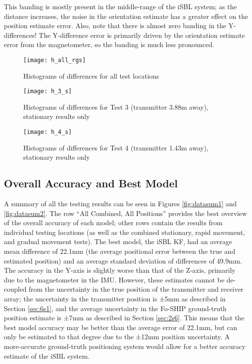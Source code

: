 \documentclass[11pt]{ucthesisCP}
\begin{document}
This banding is mostly present in the middle-range of the iSBL system; as the distance increases, the noise in the orientation estimate has a greater effect on the position estimate error. Also, note that there is almost zero banding in the Y-differences! The Y-difference error is primarily driven by the orientation estimate error from the magnetometer, so the banding is much less pronounced. 

\begin{figure}[htbp]
	\centering
	\texttt{[image: h\_all\_rgs]}
	\caption{Histograms of differences for all test locations}
	\label{fig:h_all_rgs}
\end{figure}

\begin{figure}[htbp]
	\centering
	\texttt{[image: h\_3\_s]}
	\caption{Histograms of differences for Test 3 (transmitter 3.88m away), stationary results only}
	\label{fig:h_3_s}
\end{figure}

\begin{figure}[htbp]
	\centering
	\texttt{[image: h\_4\_s]}
	\caption{Histograms of differences for Test 4 (transmitter 1.43m away), stationary results only}
	\label{fig:h_4_s}
\end{figure}

\subsection{Overall Accuracy and Best Model} \label{ssec:6s2s6}
A summary of all the testing results can be seen in Figures \ref{fig:datasum1} and \ref{fig:datasum2}. The row “All Combined, All Positions” provides the best overview of the overall accuracy of each model; other rows contain the results from individual testing locations (as well as the combined stationary, rapid movement, and gradual movement tests). The best model, the iSBL KF, had an average mean difference of 22.1mm (the average positional error between the true and estimated position) and an average standard deviation of differences of 49.9mm. The accuracy in the Y-axis is slightly worse than that of the Z-axis, primarily due to the magnetometer in the IMU. However, these estimates cannot be de-coupled from the uncertainty in the true position of the transmitter and receiver array; the uncertainty in the transmitter position is ±5mm as described in Section \ref{sec:6s1}, and the average uncertainty in the Fo-SHIP ground-truth position estimate is ±7mm as described in Section \ref{sec:2s6}. This means that the best model accuracy may be better than the average error of 22.1mm, but can only be estimated to that degree due to the ±12mm position uncertainty. A more-accurate ground-truth positioning system would allow for a better accuracy estimate of the iSBL system.
\end{document}
